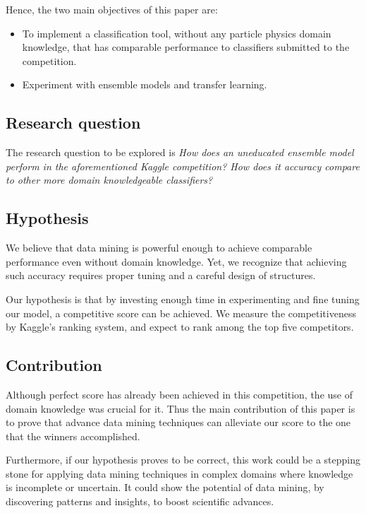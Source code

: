 \documentclass[conference]{IEEEtran}
\begin{document}
Hence, the two main objectives of this paper are:

\begin{itemize}
	\item To implement a classification tool, without any particle physics domain knowledge, that has comparable performance to classifiers submitted to the competition.
	\item Experiment with ensemble models and transfer learning. 
\end{itemize}

\subsection{Research question}
\label{sec:researchQuestions}
The research question to be explored is \textit{How does an uneducated ensemble model perform in the aforementioned Kaggle competition? How does it accuracy compare to other more domain knowledgeable classifiers?}

\subsection{Hypothesis}
\label{sec:hypothesis}
We believe that data mining is powerful enough to achieve comparable performance even without domain knowledge. Yet, we recognize that achieving such accuracy requires proper tuning and a careful design of structures. 

Our hypothesis is that by investing enough time in experimenting and fine tuning our model, a competitive score can be achieved. We measure the competitiveness by Kaggle's ranking system, and expect to rank among the top five competitors.

\subsection{Contribution}
Although perfect score has already been achieved in this competition, the use of domain knowledge was crucial for it. Thus the main contribution of this paper is to prove that advance data mining techniques can alleviate our score to the one that the winners accomplished.

Furthermore, if our hypothesis proves to be correct, this work could be a stepping stone for applying data mining techniques in complex domains where knowledge is incomplete or uncertain. It could show the potential of data mining, by discovering patterns and insights, to boost scientific advances. 
\end{document}
